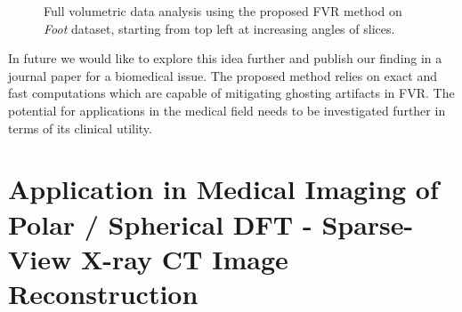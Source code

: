\documentclass{UCF_ETD}
\begin{document}
\begin{figure}[H]
\begin{center}
\caption{Full volumetric data analysis using the proposed FVR method on \emph{Foot} dataset, starting from top left at increasing angles of slices.}
\label{FullVolumetricData3.fig}
\end{center}
\end{figure}

In future we would like to explore this idea further and publish our finding in a journal paper for a biomedical issue. The proposed method relies on exact and fast computations which are capable of mitigating ghosting artifacts in FVR. The potential for applications in the medical field needs to be investigated further in terms of its clinical utility.
%
%
%
%
%
%
%
\section{Application in Medical Imaging of Polar / Spherical DFT - Sparse-View X-ray CT Image Reconstruction}
\end{document}
